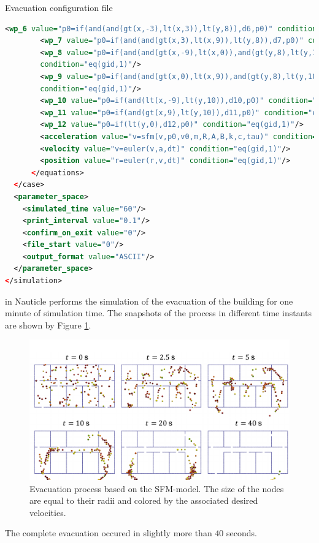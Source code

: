 \documentclass[a4paper,12pt,openany]{book}
\theoremstyle{break}
\begin{document}
\begin{samepage}
\begin{example}{Evacuation configuration file}{}
\begin{lstlisting}[language=XML]
        <wp_6 value="p0=if(and(and(gt(x,-3),lt(x,3)),lt(y,8)),d6,p0)" condition="eq(gid,1)"/>
        <wp_7 value="p0=if(and(and(gt(x,3),lt(x,9)),lt(y,8)),d7,p0)" condition="eq(gid,1)"/>
        <wp_8 value="p0=if(and(and(gt(x,-9),lt(x,0)),and(gt(y,8),lt(y,10))),d8,p0)" 
        condition="eq(gid,1)"/>
        <wp_9 value="p0=if(and(and(gt(x,0),lt(x,9)),and(gt(y,8),lt(y,10))),d9,p0)" 
        condition="eq(gid,1)"/>
        <wp_10 value="p0=if(and(lt(x,-9),lt(y,10)),d10,p0)" condition="eq(gid,1)"/>
        <wp_11 value="p0=if(and(gt(x,9),lt(y,10)),d11,p0)" condition="eq(gid,1)"/>
        <wp_12 value="p0=if(lt(y,0),d12,p0)" condition="eq(gid,1)"/>
        <acceleration value="v=sfm(v,p0,v0,m,R,A,B,k,c,tau)" condition="eq(gid,1)"/>
        <velocity value="v=euler(v,a,dt)" condition="eq(gid,1)"/>
        <position value="r=euler(r,v,dt)" condition="eq(gid,1)"/>
      </equations>
  </case>
  <parameter_space>
    <simulated_time value="60"/>
    <print_interval value="0.1"/>
    <confirm_on_exit value="0"/>
    <file_start value="0"/>
    <output_format value="ASCII"/>
  </parameter_space>
</simulation>
\end{lstlisting}
\end{example}
\end{samepage}
in Nauticle performs the simulation of the evacuation of the building for one minute of simulation time. The snapshots of the process in different time instants are shown by Figure \ref{fig:SMF_result}.
\begin{figure}[H]
  \includegraphics[scale=0.6]{evacuation_result.pdf}
  \centering
  \caption{Evacuation process based on the SFM-model. The size of the nodes are equal to their radii and colored by the associated desired velocities.}
  \label{fig:SMF_result}
\end{figure}\vspace*{3pt}
The complete evacuation occured in slightly more than $40$ seconds.
\end{document}
